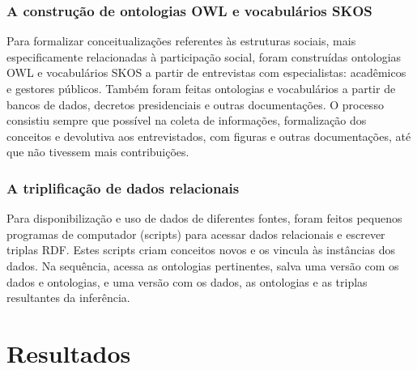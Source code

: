 \documentclass[a4paper,openright,12pt]{report} %
\begin{document}
\subsection{A construção de ontologias OWL e vocabulários SKOS}

Para formalizar conceitualizações referentes às estruturas sociais,
mais especificamente relacionadas à participação social,
foram construídas ontologias OWL e vocabulários SKOS a partir de entrevistas
com especialistas: acadêmicos e gestores públicos.
Também foram feitas ontologias e vocabulários a partir de bancos de dados,
decretos presidenciais e outras documentações.
O processo  consistiu sempre que possível na coleta de informações,
formalização dos conceitos e devolutiva aos entrevistados,
com figuras e outras documentações, até que não tivessem
mais contribuições.

\subsection{A triplificação de dados relacionais}
Para disponibilização e uso de dados de diferentes fontes, foram
feitos pequenos programas de computador (scripts) para
acessar dados relacionais e escrever triplas RDF. Estes scripts
criam conceitos novos e os vincula às instâncias dos dados.
Na sequência, acessa as ontologias pertinentes, salva
uma versão com os dados e ontologias, e uma versão
com os dados, as ontologias e as triplas resultantes da inferência.


\chapter{Resultados}
\end{document}
